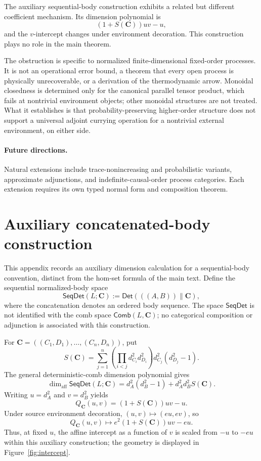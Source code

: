 \documentclass[11pt,a4paper]{article}
\theoremstyle{definition}
\theoremstyle{plain}
\theoremstyle{remark}
\newcommand{\Det}{\mathsf{Det}}
\newcommand{\Comb}{\mathsf{Comb}}
\newcommand{\affdim}{\dim_{\mathrm{aff}}}
\newcommand{\concat}{\mathbin{\|}}
\begin{document}
The auxiliary sequential-body construction exhibits a related but
different coefficient mechanism. Its dimension polynomial is
\[
(1+S(\mathbf C))uv-u,
\]
and the $v$-intercept changes under environment decoration. This
construction plays no role in the main theorem.

The obstruction is specific to normalized finite-dimensional
fixed-order processes. It is not an operational error bound, a theorem
that every open process is physically unrecoverable, or a derivation of
the thermodynamic arrow. Monoidal closedness is determined only for the
canonical parallel tensor product, which fails at nontrivial environment
objects; other monoidal structures are not treated. What it establishes
is that probability-preserving higher-order structure does not support a
universal adjoint currying operation for a nontrivial external
environment, on either side.

\paragraph{Future directions.}
Natural extensions include trace-nonincreasing and probabilistic
variants, approximate adjunctions, and indefinite-causal-order process
categories. Each extension requires its own typed normal form and
composition theorem.

\appendix

\section{Auxiliary concatenated-body construction}
\label{app:seqbody}

This appendix records an auxiliary dimension calculation for a sequential-body convention, distinct from the hom-set formula of the main text. Define the sequential normalized-body space
\[
\mathsf{SeqDet}(L;\mathbf C):=\Det(((A,B))\concat\mathbf C),
\]
where the concatenation denotes an ordered body sequence. The space
$\mathsf{SeqDet}$ is not identified with the comb space
$\Comb(L,\mathbf C)$; no categorical composition or adjunction is
associated with this construction.

For $\mathbf C=((C_1,D_1),\ldots,(C_n,D_n))$, put
\[
S(\mathbf C)=\sum_{j=1}^n
\left(\prod_{i<j}d_{C_i}^2d_{D_i}^2\right)d_{C_j}^2(d_{D_j}^2-1).
\]
The general deterministic-comb dimension polynomial gives
\[
\affdim\mathsf{SeqDet}(L;\mathbf C)
=d_A^2(d_B^2-1)+d_A^2d_B^2S(\mathbf C).
\]
Writing $u=d_A^2$ and $v=d_B^2$ yields
\[
Q_{\mathbf C}(u,v)=(1+S(\mathbf C))uv-u.
\]
Under source environment decoration, $(u,v)\mapsto(eu,ev)$, so
\[
Q_{\mathbf C}(u,v)\mapsto e^2(1+S(\mathbf C))uv-eu.
\]
Thus, at fixed $u$, the affine intercept as a function of $v$ is scaled from $-u$ to $-eu$ within this auxiliary construction; the geometry is displayed in Figure~\ref{fig:intercept}.
\end{document}
